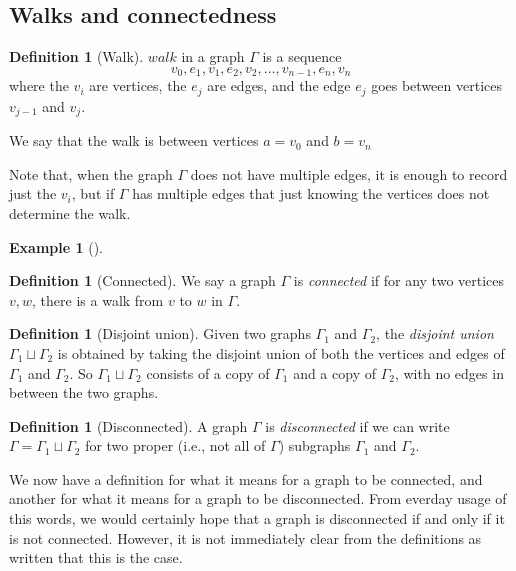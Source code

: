 \documentclass[10pt,]{book}
\theoremstyle{plain}
\theoremstyle{definition}
\newtheorem{definition}[theorem]{Definition}
\theoremstyle{definition}
\newtheorem{example}[theorem]{Example}
\theoremstyle{definition}
\begin{document}
\subsection[{Walks and connectedness}]{Walks and connectedness}\label{subsection-13}
\begin{definition}[{Walk}]\label{definition-10}
\hypertarget{p-75}{}%
\(walk\) in a graph \(\Gamma\) is a sequence%
%
\begin{equation*}
v_0, e_1, v_1,e_2, v_2,\dots, v_{n-1}, e_n, v_n
\end{equation*}
\hypertarget{p-76}{}%
where the \(v_i\) are vertices, the \(e_j\) are edges, and the edge \(e_j\) goes between vertices \(v_{j-1}\) and \(v_j\).%
\par
\hypertarget{p-77}{}%
We say that the walk is between vertices \(a=v_0\) and \(b=v_n\)%
\end{definition}
\hypertarget{p-78}{}%
Note that, when the graph \(\Gamma\) does not have multiple edges, it is enough to record just the \(v_i\), but if \(\Gamma\) has multiple edges that just knowing the vertices does not determine the walk.%
\begin{example}[]\label{example-9}
\end{example}
\begin{definition}[{Connected}]\label{definition-11}
\hypertarget{p-79}{}%
We say a graph \(\Gamma\) is \emph{connected} if for any two vertices \(v,w\), there is a walk from \(v\) to \(w\) in \(\Gamma\).%
\end{definition}
\begin{definition}[{Disjoint union}]\label{definition-12}
\hypertarget{p-80}{}%
Given two graphs \(\Gamma_1\) and \(\Gamma_2\), the \emph{disjoint union} \(\Gamma_1\sqcup \Gamma_2\) is obtained by taking the disjoint union of both the vertices and edges of \(\Gamma_1\) and \(\Gamma_2\).  So \(\Gamma_1\sqcup\Gamma_2\) consists of a copy of \(\Gamma_1\) and a copy of \(\Gamma_2\), with no edges in between the two graphs.%
\end{definition}
\begin{definition}[{Disconnected}]\label{definition-13}
\hypertarget{p-81}{}%
A graph \(\Gamma\) is \emph{disconnected} if we can write \(\Gamma=\Gamma_1\sqcup \Gamma_2\) for two proper (i.e., not all of \(\Gamma\)) subgraphs \(\Gamma_1\) and \(\Gamma_2\).%
\end{definition}
\hypertarget{p-82}{}%
We now have a definition for what it means for a graph to be connected, and another for what it means for a graph to be disconnected.  From everday usage of this words, we would certainly hope that a graph is disconnected if and only if it is not connected.  However, it is not immediately clear from the definitions as written that this is the case.%
\end{document}
